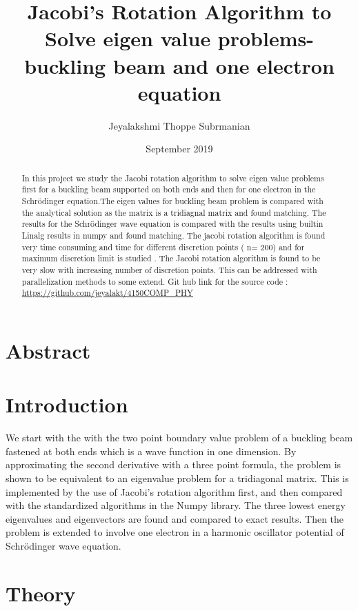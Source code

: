 \documentclass{article}
\title{Jacobi's Rotation Algorithm to Solve eigen value problems-buckling beam and \SL one electron equation }
\author{Jeyalakshmi Thoppe Subrmanian }
\date{September 2019}
\begin{document}
\maketitle

\section{Abstract}
\begin{abstract}
In this project we study the Jacobi rotation algorithm to solve eigen value problems first for a buckling beam supported on both ends and then for one  electron in the Schrödinger equation.The eigen values for buckling beam problem is compared with the analytical solution as the matrix is a tridiagnal matrix  and found matching. The results for the Schrödinger wave equation is compared with the results using builtin  Linalg results in numpy and found matching. The jacobi rotation algorithm is found very time consuming and time for different discretion points ( n= 200) and  for maximum  discretion limit is studied . The Jacobi rotation algorithm is found to be very slow with increasing number of discretion points. This can be addressed with parallelization methods to some extend.
Git hub link for the source code : 
\url {https://github.com/jeyalakt/4150COMP_PHY}


\end{abstract}


\section{Introduction}

We start with the with the two point boundary value problem of a buckling beam fastened at both ends which is a wave function in one dimension. By approximating the second derivative with a three point formula, the problem is shown to be equivalent to an eigenvalue problem for a tridiagonal matrix. This is implemented by the use of Jacobi’s rotation algorithm first, and then compared with the standardized algorithms in the Numpy library. The three lowest energy eigenvalues and eigenvectors are found and compared to exact results. 
Then the problem is extended to involve one electron in a harmonic oscillator potential of Schrödinger wave equation.

\section{Theory}
\end{document}

